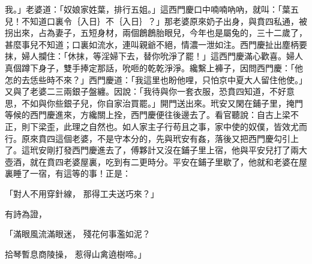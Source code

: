 \begin{showcontents}{}
我。」老婆道：「奴娘家姓葉，排行五姐。」這西門慶口中喃喃吶吶，就叫：「葉五兒！不知道口裏令｛入日｝不｛入日｝？」那老婆原來奶子出身，與賁四私通，被拐出來，占為妻子，五短身材，兩個鶬鶬胎眼兒，今年也是屬兔的，三十二歲了，甚麼事兒不知道；口裏如流水，連叫親爺不絕，情濃一泄如注。西門慶扯出塵柄要抹，婦人攔住：「休抹，等淫婦下去，替你吮淨了罷！」這西門慶滿心歡喜。婦人真個蹲下身子，雙手捧定那話，吮咂的乾乾淨淨。纔繫上褲子，因問西門慶：「他怎的去恁些時不來？」西門慶道：「我這里也盼他哩，只怕京中夏大人留住他使。」又與了老婆二三兩銀子盤纏。因說：「我待與你一套衣服，恐賁四知道，不好意思，不如與你些銀子兒，你自家治買罷。」開門送出來。玳安又閑在鋪子里，掩門等候的西門慶進來，方纔關上拴，西門慶便往後邊去了。看官聽說：自古上梁不正，則下梁歪，此理之自然也。如人家主子行苟且之事，家中使的奴僕，皆效尤而行。原來賁四這個老婆，不是守本分的，先與玳安有姦，落後又把西門慶勾引上了。這玳安剛打發西門慶進去了，傅夥計又沒在鋪子里上宿，他與平安兒打了兩大壺酒，就在賁四老婆屋裏，吃到有二更時分。平安在鋪子里歇了，他就和老婆在屋裏睡了一宿，有這等的事！正是：

「對人不用穿針線，  那得工夫送巧來？」

有詩為證，

「滿眼風流滿眼迷，  殘花何事濫如泥？

拾琴暫息商陵操，  惹得山禽遶樹啼。」


\end{showcontents}
